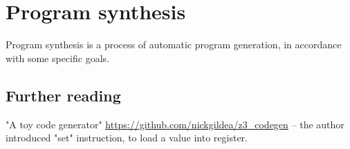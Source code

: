 \chapter{Program synthesis}

Program synthesis is a process of automatic program generation, in accordance with some specific goals.







\section{Further reading}

"A toy code generator" \url{https://github.com/nickgildea/z3_codegen} -- the author introduced "set" instruction,
to load a value into register.

